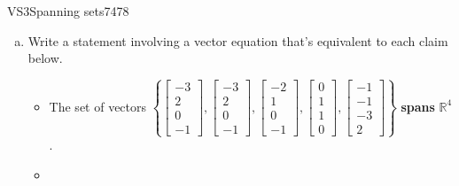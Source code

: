 \begin{exercise}{VS3}{Spanning sets}{7478} 
\begin{exerciseStatement} 

\begin{enumerate}[(a)]
\item  

 Write a statement involving a vector equation that's equivalent to each claim below. 

 

\begin{itemize}
\item  

 The set of vectors \(\left\{ \left[\begin{array}{c}
-3 \\
2 \\
0 \\
-1
\end{array}\right] , \left[\begin{array}{c}
-3 \\
2 \\
0 \\
-1
\end{array}\right] , \left[\begin{array}{c}
-2 \\
1 \\
0 \\
-1
\end{array}\right] , \left[\begin{array}{c}
0 \\
1 \\
1 \\
0
\end{array}\right] , \left[\begin{array}{c}
-1 \\
-1 \\
-3 \\
2
\end{array}\right] \right\}\) \textbf{spans} \(\mathbb R^4\). 

 
\item  


\end{itemize}
\end{enumerate}
\end{exerciseStatement}
\end{exercise}
